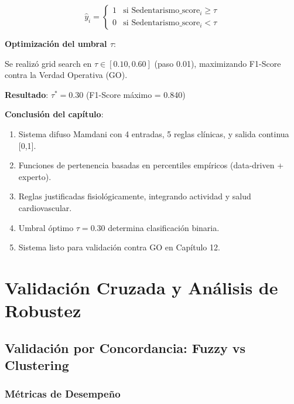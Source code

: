\documentclass[12pt,letterpaper,twoside]{report}
\begin{document}
\begin{equation}
\hat{y}_i = 
\begin{cases}
1 & \text{si } \text{Sedentarismo\_score}_i \geq \tau \\
0 & \text{si } \text{Sedentarismo\_score}_i < \tau
\end{cases}
\end{equation}

\begin{decisionbox}
\textbf{Optimización del umbral $\tau$}:

Se realizó grid search en $\tau \in [0.10, 0.60]$ (paso 0.01), maximizando F1-Score contra la Verdad Operativa (GO).

\textbf{Resultado}: $\tau^* = 0.30$ (F1-Score máximo = 0.840)
\end{decisionbox}

\begin{conclusionbox}
\textbf{Conclusión del capítulo}:

\begin{enumerate}[noitemsep]
    \item Sistema difuso Mamdani con 4 entradas, 5 reglas clínicas, y salida continua [0,1].
    \item Funciones de pertenencia basadas en percentiles empíricos (data-driven + experto).
    \item Reglas justificadas fisiológicamente, integrando actividad y salud cardiovascular.
    \item Umbral óptimo $\tau=0.30$ determina clasificación binaria.
    \item Sistema listo para validación contra GO en Capítulo 12.
\end{enumerate}
\end{conclusionbox}

\chapter{Validación Cruzada y Análisis de Robustez}

\section{Validación por Concordancia: Fuzzy vs Clustering}

\subsection{Métricas de Desempeño}
\end{document}
